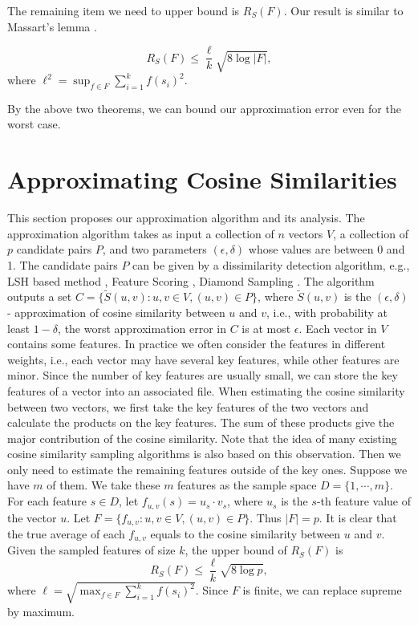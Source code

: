 \documentclass[sigconf,anonymous]{acmart}
\begin{document}
The remaining item we need to upper bound is $R_S(F)$. Our result is similar to Massart's lemma \cite{AGO14}.

\begin{theorem}
\label{thm2}
$$R_S(F) \leq \frac{\ell}{k}\sqrt{8\log |F|},$$
where $\ell^2 = \sup_{f\in F}\sum_{i=1}^k f(s_i)^2$.
\end{theorem}

By the above two theorems, we can bound our approximation error even for the worst case.


\section{Approximating Cosine Similarities}
\label{sec:acs}
This section proposes our approximation algorithm and its analysis.
{\color{black}
The approximation algorithm takes as input a collection of $n$ vectors $V$, a collection of $p$ candidate pairs $P$, and two parameters $(\epsilon, \delta)$ whose values are between 0 and 1. The candidate pairs $P$ can be given by a dissimilarity detection algorithm, e.g., LSH based method \cite{LRU14}, Feature Scoring \cite{CL99}, Diamond Sampling \cite{BKP15}. The algorithm outputs a set $C = \{\tilde{S}(u,v): u,v \in V, (u,v)\in P\}$, where $\tilde{S}(u,v)$ is the $(\epsilon, \delta)$- approximation of cosine similarity between $u$ and $v$, i.e., with probability at least $1-\delta$, the worst approximation error in $C$ is at most $\epsilon$. Each vector in $V$ contains some features. In practice we often consider the features in different weights, i.e., each vector may have several key features, while other features are minor. Since the number of key features are usually small, we can store the key features of a vector into an associated file. When estimating the cosine similarity between two vectors, we first take the key features of the two vectors and calculate the products on the key features. The sum of these products give the major contribution of the cosine similarity. Note that the idea of many existing cosine similarity sampling algorithms \cite{CL99,BKP15} is also based on this observation. Then we only need to estimate the remaining features outside of the key ones. Suppose we have $m$ of them. We take these $m$ features as the sample space $D = \{1,\cdots,m\}$. For each feature $s\in D$, let $f_{u,v}(s) = u_s\cdot v_s$, where $u_s$ is the $s$-th feature value of the vector $u$. Let $F = \{f_{u,v}: u,v\in V, (u,v)\in P\}$. Thus $|F| = p$. It is clear that the true average of each $f_{u,v}$ equals to the cosine similarity between $u$ and $v$. Given the sampled features of size $k$, the upper bound of $R_S(F)$ is 
$$R_S(F) \leq \frac{\ell}{k}\sqrt{8\log p},$$
where $\ell = \sqrt{\max_{f\in F} \sum_{i=1}^k f(s_i)^2}$. Since $F$ is finite, we can replace supreme by maximum. 
}
\end{document}
